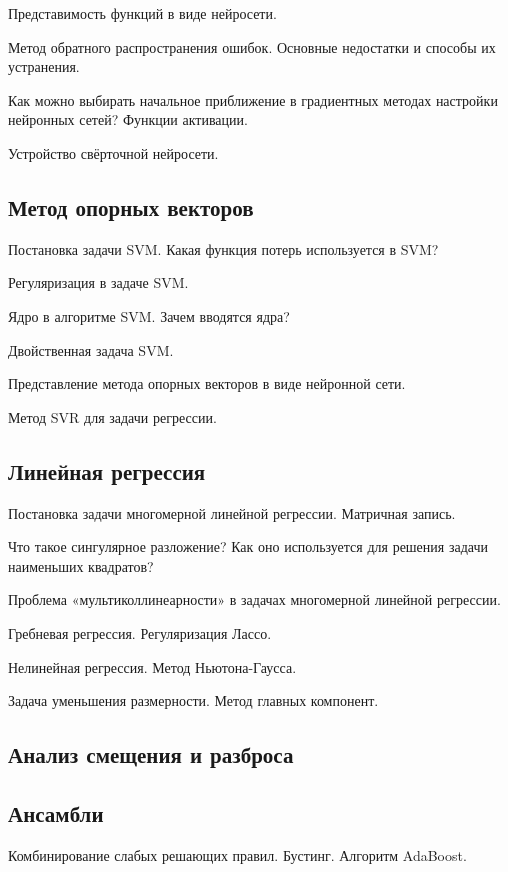 \documentclass[a4paper,12pt]{article}
\begin{document}
  \myparagraph Представимость функций в виде нейросети.
  
  \myparagraph Метод обратного распространения ошибок. Основные недостатки и способы их устранения.

  \myparagraph Как можно выбирать начальное приближение в градиентных методах настройки нейронных сетей? Функции активации.

  \myparagraph Устройство свёрточной нейросети.
  
  \subsection*{Метод опорных векторов}
  
  \myparagraph Постановка задачи SVM. Какая функция потерь используется в SVM? 
  
  \myparagraph Регуляризация в задаче SVM. 
  
  \myparagraph Ядро в алгоритме SVM. Зачем вводятся ядра? 
  
  \myparagraph Двойственная задача SVM. 

  \myparagraph Представление метода опорных векторов в виде нейронной сети.
  
  \myparagraph Метод SVR для задачи регрессии.
      
  \subsection*{Линейная регрессия}
  
  \myparagraph Постановка задачи многомерной линейной регрессии. Матричная запись.
  
  \myparagraph Что такое сингулярное разложение? Как оно используется для решения задачи наименьших квадратов?

  \myparagraph Проблема «мультиколлинеарности» в задачах многомерной линейной регрессии. 
  
  \myparagraph Гребневая регрессия. Регуляризация Лассо.
  
  \myparagraph Нелинейная регрессия. Метод Ньютона-Гаусса.
  
  \myparagraph Задача уменьшения размерности. Метод главных компонент. 
  
  \subsection*{Анализ смещения и разброса}
  
  \myparagraph 
  
  \myparagraph 
  
  \myparagraph 
  
  \myparagraph 
  
  \myparagraph 
  
  \subsection*{Ансамбли}
  
  \myparagraph Комбинирование слабых решающих правил. Бустинг. Алгоритм AdaBoost. 
  
  \myparagraph 
  
  \myparagraph 
  
  \myparagraph 
  
  \myparagraph 
\end{document}
